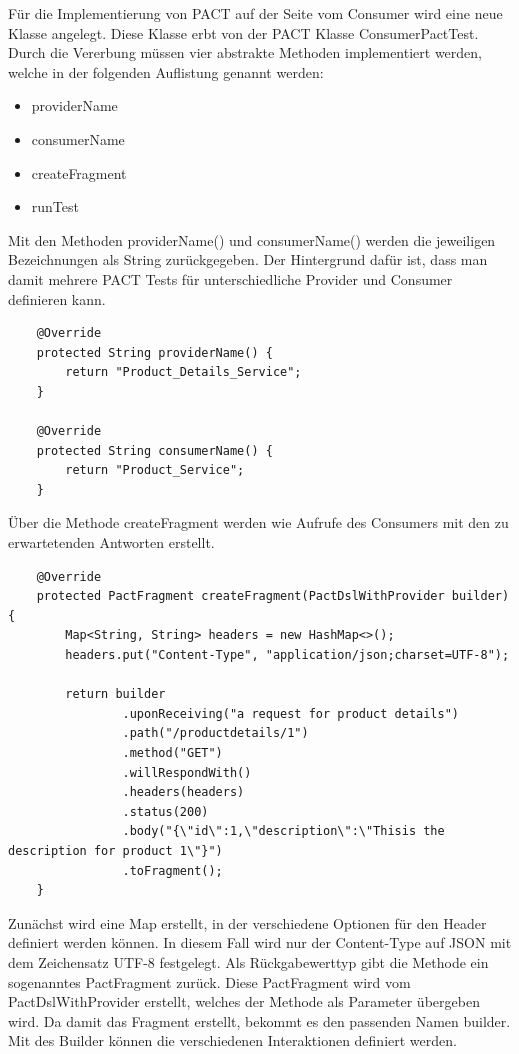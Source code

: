 \documentclass{llncs}
\begin{document}
Für die Implementierung von PACT auf der Seite vom Consumer wird eine neue Klasse angelegt. Diese Klasse erbt von der PACT Klasse ConsumerPactTest. Durch die Vererbung müssen vier abstrakte Methoden implementiert werden, welche in der folgenden Auflistung genannt werden:
\begin{itemize}
\item providerName
\item consumerName
\item createFragment
\item runTest
\end{itemize}


Mit den Methoden providerName() und consumerName() werden die jeweiligen Bezeichnungen als String zurückgegeben. Der Hintergrund dafür ist, dass man damit mehrere PACT Tests für unterschiedliche Provider und Consumer definieren kann.
\lstset{language = Java}
\begin{lstlisting}
    @Override
    protected String providerName() {
        return "Product_Details_Service";
    }

    @Override
    protected String consumerName() {
        return "Product_Service";
    }
\end{lstlisting}

Über die Methode createFragment werden wie Aufrufe des Consumers mit den zu erwartetenden Antworten erstellt.
\lstset{language = Java}
\begin{lstlisting}
    @Override
    protected PactFragment createFragment(PactDslWithProvider builder) {
        Map<String, String> headers = new HashMap<>();
        headers.put("Content-Type", "application/json;charset=UTF-8");
        
        return builder
        		.uponReceiving("a request for product details")
                .path("/productdetails/1")
                .method("GET")
                .willRespondWith()
                .headers(headers)
                .status(200)
                .body("{\"id\":1,\"description\":\"Thisis the description for product 1\"}")
                .toFragment();
    }
\end{lstlisting}
Zunächst wird eine Map erstellt, in der verschiedene Optionen für den Header definiert werden können. In diesem Fall wird nur der  Content-Type auf JSON mit dem Zeichensatz UTF-8 festgelegt. Als Rückgabewerttyp gibt die Methode ein sogenanntes PactFragment zurück. Diese PactFragment wird vom PactDslWithProvider erstellt, welches der Methode als Parameter übergeben wird. Da damit das Fragment erstellt, bekommt es den passenden Namen builder. Mit des Builder können die verschiedenen Interaktionen definiert werden.
\end{document}
